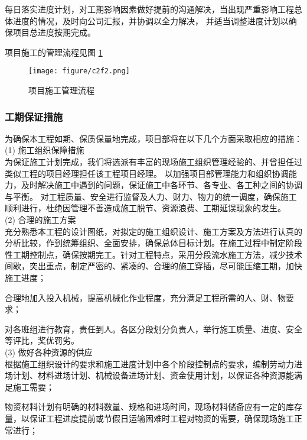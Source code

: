 每日落实进度计划，对工期影响因素做好提前的沟通解决，当出现严重影响工程总体进度的情况，及时向公司汇报，并协调以全力解决，
并适当调整进度计划以确保项目总进度按期完成。

项目施工的管理流程见图 \ref{fig:c2f2}

\begin{figure}[thbp!]
    \centering
    \texttt{[image: figure/c2f2.png]}
    \caption{项目施工管理流程}
    \label{fig:c2f2}
\end{figure}

\clearpage
\subsubsection{工期保证措施}

为确保本工程如期、保质保量地完成，项目部将在以下几个方面采取相应的措施：\\

(1) 施工组织保障措施\\

为保证施工计划完成，我们将选派有丰富的现场施工组织管理经验的、并曾担任过类似工程的项目经理担任该工程项目经理。
以加强项目部管理能力和组织协调能力，及时解决施工中遇到的问题，保证施工中各环节、各专业、各工种之间的协调与平衡。
对工程质量、安全进行监督及人力、财力、物力的统一调度，确保施工顺利进行，杜绝因管理不善造成施工脱节、资源浪费、工期延误现象的发生。\\

(2) 合理的施工方案\\

 充分熟悉本工程的设计图纸，对拟定的施工组织设计、施工方案及方法进行认真的分析比较，作到统筹组织、全面安排，确保总体目标计划。在施工过程中制定阶段性工期控制点，确保按期完工。针对工程特点，采用分段流水施工方法，减少技术间歇，突出重点，制定严密的、紧凑的、合理的施工穿插，尽可能压缩工期，加快施工进度；

 合理地加入投入机械，提高机械化作业程度，充分满足工程所需的人、财、物要求；

 对各班组进行教育，责任到人。各区分段划分负责人，举行施工质量、进度、安全等评比，奖优罚劣。\\

(3) 做好各种资源的供应\\

 根据施工组织设计的要求和施工进度计划中各个阶段控制点的要求，编制劳动力进场计划、材料进场计划、机械设备进场计划、资金使用计划，以保证各种资源能满足施工需要；

 物资材料计划有明确的材料数量、规格和进场时间，现场材料储备应有一定的库存量，以保证工程进度提前或节假日运输困难时工程对物资的需要，确保现场施工正常进行；

